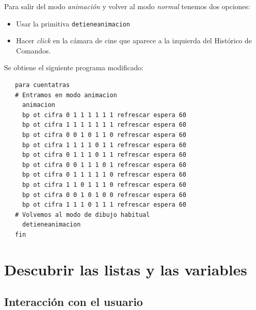 \documentclass[12pt,twoside,spanish,a4paper]{report}
\begin{document}
Para salir del modo \textit{animaci\'on} y volver al modo \textit{normal}
tenemos dos opciones:
\begin{itemize}
   \item Usar la primitiva \texttt{detieneanimacion} 
   \item Hacer \textit{click} en la c\'amara de cine que aparece a la
      izquierda del Hist\'orico de Comandos.
\end{itemize}

Se obtiene el siguiente programa modificado:
\begin{verbatim}
   para cuentatras
   # Entramos en modo animacion
     animacion
     bp ot cifra 0 1 1 1 1 1 1 refrescar espera 60
     bp ot cifra 1 1 1 1 1 1 1 refrescar espera 60
     bp ot cifra 0 0 1 0 1 1 0 refrescar espera 60
     bp ot cifra 1 1 1 1 0 1 1 refrescar espera 60
     bp ot cifra 0 1 1 1 0 1 1 refrescar espera 60
     bp ot cifra 0 0 1 1 1 0 1 refrescar espera 60
     bp ot cifra 0 1 1 1 1 1 0 refrescar espera 60
     bp ot cifra 1 1 0 1 1 1 0 refrescar espera 60
     bp ot cifra 0 0 1 0 1 0 0 refrescar espera 60
     bp ot cifra 1 1 1 0 1 1 1 refrescar espera 60
   # Volvemos al modo de dibujo habitual
     detieneanimacion
   fin  \end{verbatim}

\newpage{}

\chapter{Descubrir las listas y las variables}
   \label{sec:Listas-Variables}

\section{Interacci\'on con el usuario}
   \label{sub:Interaccion-Usuario}
\end{document}
